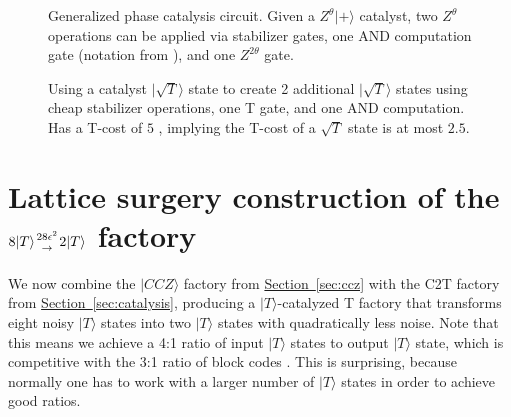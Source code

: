 \documentclass[superscriptaddress,notitlepage,longbibliography]{revtex4-1}
\renewcommand{\sec}[1]{\hyperref[sec:#1]{Section~\ref*{sec:#1}}}
\newcommand{\factory}[3]{$#1 \genfrac{}{}{0pt}{}{#2}{\rightarrow} {#3}$ factory}
\begin{document}
\begin{figure}[ht]
    \label{fig:catalysis-circuit-generalized}
    \centering
    \caption{
        Generalized phase catalysis circuit.
        Given a $Z^\theta |+\rangle$ catalyst, two $Z^\theta$ operations can be applied via stabilizer gates, one AND computation gate (notation from \cite{gidney2018}), and one $Z^{2 \theta}$ gate.
    }
\end{figure}

\begin{figure}[ht]
    \label{fig:catalysis-circuit-sqrt-t}
    \centering
    \caption{
        Using a catalyst $|\sqrt{T}\rangle$ state to create 2 additional $|\sqrt{T}\rangle$ states using cheap stabilizer operations, one T gate, and one AND computation.
        Has a T-cost of $5$ \cite{jones2013, gidney2018}, implying the T-cost of a $\sqrt{T}$ state is at most $2.5$.
    }
\end{figure}



\section{\texorpdfstring{
Lattice surgery construction of the \factory{8|T\rangle}{28\epsilon^2}{2|T\rangle}
}{
Lattice surgery construction of the 8T to 2T factory
}}
\label{sec:full}

We now combine the $|CCZ\rangle$ factory from \sec{ccz} with the C2T factory from \sec{catalysis}, producing a $|T\rangle$-catalyzed T factory that transforms eight noisy $|T\rangle$ states into two $|T\rangle$ states with quadratically less noise.
Note that this means we achieve a 4:1 ratio of input $|T\rangle$ states to output $|T\rangle$ state, which is competitive with the 3:1 ratio of block codes \cite{bravyi2012}.
This is surprising, because normally one has to work with a larger number of $|T\rangle$ states in order to achieve good ratios.
\end{document}
